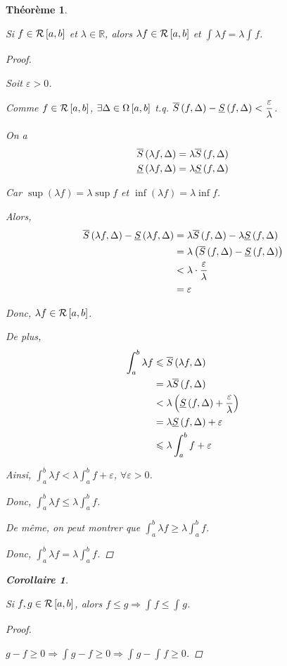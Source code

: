 \documentclass{report}
\newcommand*{\dint}[3]{\displaystyle\int_{#1}^{#2}#3}
\newcommand*{\eps}{\varepsilon}
\newcommand*{\lte}{\leqslant}
\newcommand*{\gte}{\geqslant}
\newcommand*{\reels}{\mathbb{R}}
\newtheorem*{thm}{Th\'eor\`eme}
\newtheorem*{coro}{Corollaire}
\theoremstyle{definition}
\theoremstyle{remark}
\begin{document}
	\begin{thm}
		~

		Si $f \in \riemann$ et $\lambda \in \reels$, alors $\lambda f \in \riemann$ et $\dint{}{}{\lambda f} = \lambda \dint{}{}{f}$.
		\begin{proof}~

			Soit $\eps>0$.

			Comme $f \in \riemann$, $\exists\Delta \in \partitions$ t.q. $\ssup{f} - \sinf{f} < \dfrac{\eps}{\lambda}$.

			On a
			\begin{align*}
				\ssup{\lambda f}&= \lambda \ssup{f}\\
				\sinf{\lambda f}&= \lambda \sinf{f}
			\end{align*}

			Car $\sup(\lambda f) = \lambda \sup f$ et $\inf(\lambda f) = \lambda \inf f$.

			Alors,
			\begin{align*}
				\ssup{\lambda f} - \sinf{\lambda f}&= \lambda \ssup{f} - \lambda \sinf{f}\\
				&= \lambda \left( \ssup{f} - \sinf{f} \right)\\
				&< \lambda \cdot \dfrac{\eps}{\lambda}\\
				&= \eps
			\end{align*}

			Donc, $\lambda f \in \riemann$.

			De plus,
			\begin{align*}
				\dint{a}{b}{\lambda f}&\lte \ssup{\lambda f}\\
				&= \lambda \ssup{f}\\
				&< \lambda \left( \sinf{f} + \dfrac{\eps}{\lambda} \right)\\
				&= \lambda \sinf{f} + \eps\\
				&\lte \lambda \dint{a}{b}{f} + \eps
			\end{align*}

			Ainsi, $\dint{a}{b}{\lambda f} < \lambda \dint{a}{b}{f} + \eps$, $\forall\eps>0$.

			Donc, $\dint{a}{b}{\lambda f} \lte \lambda \dint{a}{b}{f}$.

			De m\^eme, on peut montrer que $\dint{a}{b}{\lambda f} \gte \lambda \dint{a}{b}{f}$.

			Donc, $\dint{a}{b}{\lambda f} = \lambda \dint{a}{b}{f}$.
		\end{proof}
		\begin{coro}
			~

			Si $f,g \in \riemann$, alors $f \lte g \Rightarrow \dint{}{}{f} \lte \dint{}{}{g}$.
			\begin{proof}~

				$g-f \gte 0 \Rightarrow \dint{}{}{g-f} \gte 0 \Rightarrow \dint{}{}{g} - \dint{}{}{f} \gte 0$.
			\end{proof}
		\end{coro}
	\end{thm}
\end{document}

